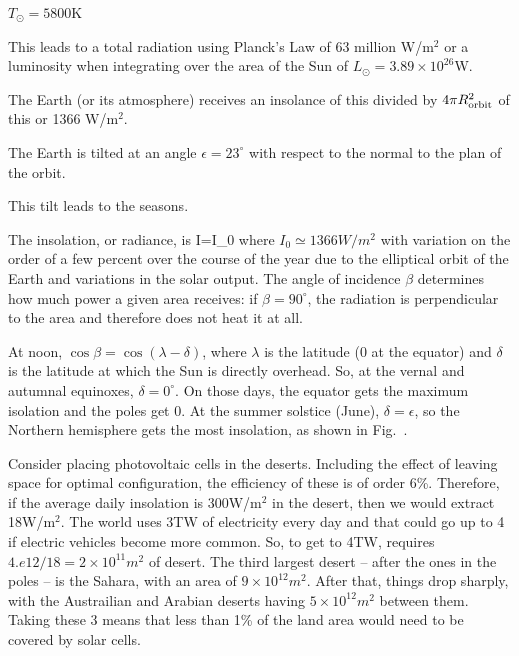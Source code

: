 \documentclass[11pt]{book}
\begin{document}


\bei
\item $T_\odot=5800$K
\item This leads to a total radiation using Planck's Law of 63 million W/m$^2$ or a luminosity when integrating over the area of the Sun of $L_\odot=3.89\times 10^{26}$W.
\item The Earth (or its atmosphere) receives an insolance of this divided by $4\pi R_{\rm orbit}^2$ of this or 1366 W/m$^2$.
\eei





\bei
\item The Earth is tilted at an angle $\epsilon=23^\circ$ with respect to the normal to the plan of the orbit.
\item This tilt leads to the seasons.
\item The insolation, or radiance, is
\be
I=I_0\cos\beta
\ee
where $I_0\simeq 1366 W/m^2$ with variation on the order of a few percent over the course of the year due to the elliptical orbit of the Earth and variations in the solar output. The angle of incidence $\beta$ determines how much power a given area receives: if $\beta=90^\circ$, the radiation is perpendicular to the area and therefore does not heat it at all. 
\item At noon, $\cos\beta=\cos(\lambda-\delta)$, where $\lambda$ is the latitude (0 at the equator) and $\delta$ is the latitude at which the Sun is directly overhead. So, at the vernal and autumnal equinoxes, $\delta=0^\circ$. On those days, the equator gets the maximum isolation and the poles get 0. At the summer solstice (June), $\delta=\epsilon$, so the Northern hemisphere gets the most insolation, as shown in Fig.~.
\eei


Consider placing photovoltaic cells in the deserts. Including the effect of leaving space for optimal configuration, the efficiency of these is of order 6\%. Therefore, if the average daily insolation is 300W/m$^2$ in the desert, then we would extract 18W/m$^2$. The world uses 3TW of electricity every day and that could go up to 4 if electric vehicles become more common. So, to get to 4TW, requires $4.e12/18=2\times 10^{11}m^2$ of desert. The third largest desert -- after the ones in the poles -- is the Sahara, with an area of $9\times 10^{12}m^2$. After that, things drop sharply, with the Austrailian and Arabian deserts having $5\times 10^{12}m^2$ between them. Taking these 3 means that less than 1\% of the land area would need to be covered by solar cells.
\end{document}

